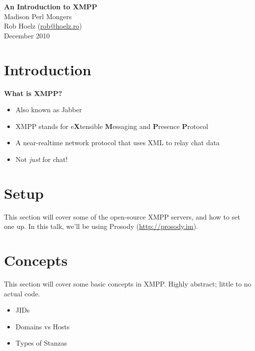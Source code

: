 \documentclass{article}
\begin{document}
\begin{titlepage}
\vspace*{\fill}
\begin{center}
{\huge \bfseries An Introduction to XMPP} \\[0.5cm]
{\LARGE Madison Perl Mongers} \\[0.5cm]
{\large Rob Hoelz (\href{mailto:rob@hoelz.ro}{rob@hoelz.ro})} \\[0.5cm]
{\large December 2010}
\end{center}
\vspace*{\fill}
\end{titlepage}

\newpage
\part{Introduction}

\newpage
\begin{center}
{\huge \bfseries What is XMPP?}
\end{center}
\pause

\begin{itemize}
\item Also known as Jabber
\pause
\item XMPP stands for e\textbf{X}tensible \textbf{M}essaging and \textbf{P}resence \textbf{P}rotocol
\pause
\item A near-realtime network protocol that uses XML to relay chat data
\pause
\item Not \textit{just} for chat!
\end{itemize}

\newpage
\part{Setup}

\newpage
This section will cover some of the open-source XMPP servers, and
how to set one up.  In this talk, we'll be using Prosody (\url{http://prosody.im}).

\newpage
\part{Concepts}

\newpage
This section will cover some basic concepts in XMPP.  Highly abstract; little to no
actual code.

\begin{itemize}
\item JIDs
\item Domains vs Hosts
\item Types of Stanzas
\end{itemize}
\end{document}
